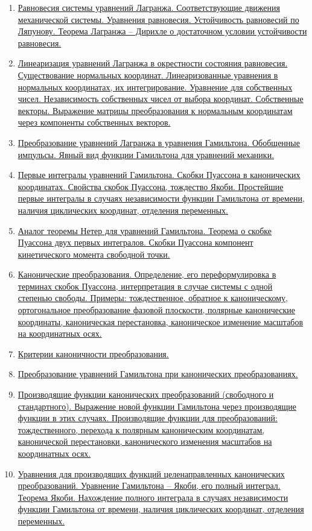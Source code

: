 \documentclass[specialist, subf, href, colorlinks=true, 12pt, times, mtpro, final]{disser}
\theoremstyle{definition}
\begin{document}
\begin{enumerate}
    \item \hyperref[11]{Равновесия системы уравнений Лагранжа. Соответствующие движения механической системы. Уравнения равновесия. Устойчивость равновесий по Ляпунову. Теорема Лагранжа – Дирихле о достаточном условии устойчивости равновесия.}
    \item \hyperref[12]{Линеаризация уравнений Лагранжа в окрестности состояния равновесия. Существование нормальных координат. Линеаризованные уравнения в нормальных координатах, их интегрирование. Уравнение для собственных чисел. Независимость собственных чисел от выбора координат. Собственные векторы. Выражение матрицы преобразования к нормальным координатам через компоненты собственных векторов.}
    \item \hyperref[13]{Преобразование уравнений Лагранжа в уравнения Гамильтона. Обобщенные импульсы. Явный вид функции Гамильтона для уравнений механики.}
    \item \hyperref[14]{Первые интегралы уравнений Гамильтона. Скобки Пуассона в канонических координатах. Свойства скобок Пуассона, тождество Якоби. Простейшие первые интегралы в случаях независимости функции Гамильтона от времени, наличия циклических координат, отделения переменных.}
    \item \hyperref[15]{Аналог теоремы Нетер для уравнений Гамильтона. Теорема о скобке Пуассона двух первых интегралов. Скобки Пуассона компонент кинетического момента свободной точки.}
    \item \hyperref[16]{Канонические преобразования. Определение, его переформулировка в терминах скобок Пуассона, интерпретация в случае системы с одной степенью свободы.
    Примеры: тождественное, обратное к каноническому, ортогональное преобразование фазовой плоскости, полярные канонические координаты, каноническая перестановка, каноническое изменение масштабов на координатных осях.}
    \item \hyperref[17]{Критерии каноничности преобразования.}
    \item \hyperref[18]{Преобразование уравнений Гамильтона при канонических преобразованиях.}
    \item \hyperref[19]{Производящие функции канонических преобразований (свободного и стандартного). Выражение новой функции Гамильтона через производящие функции в этих случаях.
    Производящие функции для преобразований: тождественного, перехода к полярным каноническим координатам, канонической перестановки, канонического изменения масштабов на координатных осях.}
    \item \hyperref[20]{Уравнения для производящих функций целенаправленных канонических преобразований. Уравнение Гамильтона – Якоби, его полный интеграл. Теорема Якоби. Нахождение полного интеграла в случаях независимости функции Гамильтона от времени, наличия циклических координат, отделения переменных.}

\end{enumerate}
\end{document}
